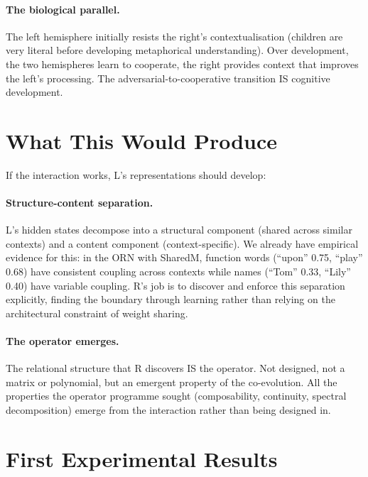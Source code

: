 \documentclass[11pt, a4paper]{article}
\theoremstyle{plain}
\theoremstyle{definition}
\theoremstyle{remark}
\begin{document}
\paragraph{The biological parallel.}
The left hemisphere initially resists the right's contextualisation (children are very literal before developing metaphorical understanding).
Over development, the two hemispheres learn to cooperate, the right provides context that improves the left's processing.
The adversarial-to-cooperative transition IS cognitive development.


\section{What This Would Produce}

If the interaction works, L's representations should develop:

\paragraph{Structure-content separation.}
L's hidden states decompose into a structural component (shared across similar contexts) and a content component (context-specific).
We already have empirical evidence for this: in the ORN with SharedM, function words (``upon'' 0.75, ``play'' 0.68) have consistent coupling across contexts while names (``Tom'' 0.33, ``Lily'' 0.40) have variable coupling.
R's job is to discover and enforce this separation explicitly, finding the boundary through learning rather than relying on the architectural constraint of weight sharing.

\paragraph{The operator emerges.}
The relational structure that R discovers IS the operator.
Not designed, not a matrix or polynomial, but an emergent property of the co-evolution.
All the properties the operator programme sought (composability, continuity, spectral decomposition) emerge from the interaction rather than being designed in.


\section{First Experimental Results}
\label{sec:first-results}
\end{document}
